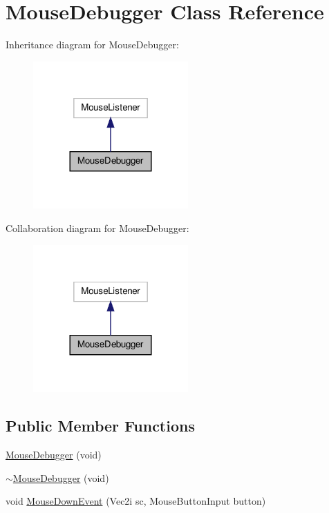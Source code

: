\hypertarget{class_mouse_debugger}{\section{Mouse\-Debugger Class Reference}
\label{class_mouse_debugger}
}


Inheritance diagram for Mouse\-Debugger\-:\nopagebreak
\begin{figure}[H]
\begin{center}
\leavevmode
\includegraphics[width=168pt]{class_mouse_debugger__inherit__graph}
\end{center}
\end{figure}


Collaboration diagram for Mouse\-Debugger\-:\nopagebreak
\begin{figure}[H]
\begin{center}
\leavevmode
\includegraphics[width=168pt]{class_mouse_debugger__coll__graph}
\end{center}
\end{figure}
\subsection*{Public Member Functions}
\begin{DoxyCompactItemize}
\item 
\hyperlink{class_mouse_debugger_ad412f746c7415c334d346f40ba4c9a05}{Mouse\-Debugger} (void)
\item 
\hyperlink{class_mouse_debugger_a6b60c23ad59db3df59e3fefcacde9042}{$\sim$\-Mouse\-Debugger} (void)
\item 
void \hyperlink{class_mouse_debugger_a0d7f7e10a54cd1fc98370467805b24ac}{Mouse\-Down\-Event} (Vec2i sc, Mouse\-Button\-Input button)
\end{DoxyCompactItemize}


